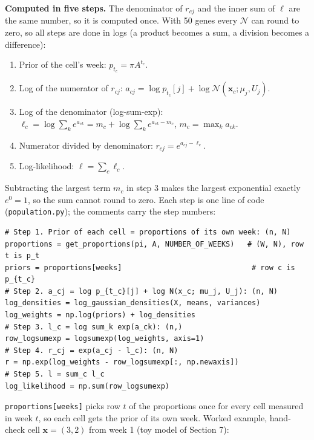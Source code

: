 \documentclass[10pt,a4paper]{article}
\begin{document}
\textbf{Computed in five steps.} The denominator of $r_{cj}$ and the inner sum of $\ell$ are the same number, so it is computed once. With 50 genes every $\mathcal{N}$ can round to zero, so all steps are done in logs (a product becomes a sum, a division becomes a difference):
\begin{enumerate}[label=\arabic*.]
  \item Prior of the cell's week: $p_{t_c} = \pi A^{t_c}$.
  \item Log of the numerator of $r_{cj}$: \quad $a_{cj} = \log p_{t_c}[j] + \log \mathcal{N}(\mathbf{x}_c; \mu_j, U_j)$.
  \item Log of the denominator (log-sum-exp): \quad $\ell_c = \log \sum_k e^{a_{ck}} = m_c + \log \sum_k e^{a_{ck} - m_c}$, \quad $m_c = \max_k a_{ck}$.
  \item Numerator divided by denominator: \quad $r_{cj} = e^{a_{cj} - \ell_c}$.
  \item Log-likelihood: \quad $\ell = \sum_c \ell_c$.
\end{enumerate}
Subtracting the largest term $m_c$ in step 3 makes the largest exponential exactly $e^0 = 1$, so the sum cannot round to zero. Each step is one line of code (\texttt{population.py}); the comments carry the step numbers:
\begin{lstlisting}
# Step 1. Prior of each cell = proportions of its own week: (n, N)
proportions = get_proportions(pi, A, NUMBER_OF_WEEKS)   # (W, N), row t is p_t
priors = proportions[weeks]                              # row c is p_{t_c}
# Step 2. a_cj = log p_{t_c}[j] + log N(x_c; mu_j, U_j): (n, N)
log_densities = log_gaussian_densities(X, means, variances)
log_weights = np.log(priors) + log_densities
# Step 3. l_c = log sum_k exp(a_ck): (n,)
row_logsumexp = logsumexp(log_weights, axis=1)
# Step 4. r_cj = exp(a_cj - l_c): (n, N)
r = np.exp(log_weights - row_logsumexp[:, np.newaxis])
# Step 5. l = sum_c l_c
log_likelihood = np.sum(row_logsumexp)
\end{lstlisting}
\texttt{proportions[weeks]} picks row $t$ of the proportions once for every cell measured in week $t$, so each cell gets the prior of its own week. Worked example, hand-check cell $\mathbf{x} = (3, 2)$ from week 1 (toy model of Section 7):
\end{document}
